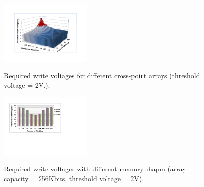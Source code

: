 \begin{figure}%
\centering
\hspace{-5pt}
  \includegraphics[width=0.4\textwidth]{./figures/worst_v_f1.pdf}\\
  \caption{Required write voltages for different cross-point arrays (threshold voltage = 2V.). }\label{fig:worst_v}
  \vspace{-5pt}
\end{figure}


\begin{figure}%
\centering
  \includegraphics[width=0.4\textwidth]{./figures/shape_f.pdf}\\
  \caption{Required write voltages with different memory shapes (array capacity = 256Kbits, threshold voltage = 2V).}\label{fig:shape}
    \vspace{-15pt}
\end{figure}







